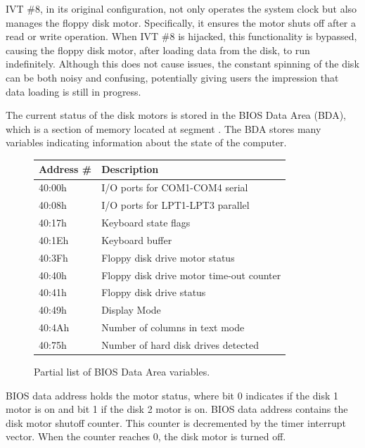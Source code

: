 \documentclass[book.tex]{subfiles}
\begin{document}
\par
IVT \#8, in its original configuration, not only operates the system clock but also manages the floppy disk motor. Specifically, it ensures the motor shuts off after a read or write operation. When IVT \#8 is hijacked, this functionality is bypassed, causing the floppy disk motor, after loading data from the disk, to run indefinitely. Although this does not cause issues, the constant spinning of the disk can be both noisy and confusing, potentially giving users the impression that data loading is still in progress.\\

\par
The current status of the disk motors is stored in the BIOS Data Area (BDA), which is a section of memory located at segment . The BDA stores many variables indicating information about the state of the computer.\\

\begin{figure}[H]
	\centering
	\begin{tabularx}{\textwidth}{ l p{}  }
	  \toprule
	  \textbf{Address \#} & \textbf{Description} \\ \bottomrule
40:00h	&	I/O ports for COM1-COM4 serial \\
40:08h	&	I/O ports for LPT1-LPT3 parallel \\
40:17h	&	Keyboard state flags \\
40:1Eh	&	Keyboard buffer \\
40:3Fh	&	Floppy disk drive motor status \\
40:40h	&	Floppy disk drive motor time-out counter \\
40:41h	&	Floppy disk drive status \\
40:49h & 	Display Mode \\
40:4Ah & 	Number of columns in text mode \\
40:75h & 	Number of hard disk drives detected \\
		\bottomrule
	\end{tabularx}
	\caption{Partial list of BIOS Data Area variables\protect\footnotemark.}
\end{figure}

\pagebreak
BIOS data address  holds the motor status, where bit 0 indicates if the disk 1 motor is on and bit 1 if the disk 2 motor is on. BIOS data address  contains the disk motor shutoff counter. This counter is decremented by the timer interrupt vector. When the counter reaches 0, the disk motor is turned off.\\
\end{document}
